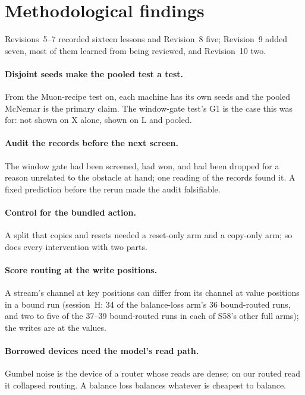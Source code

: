 \documentclass[11pt]{article}
\begin{document}
\section{Methodological findings}
\label{sec:method}

Revisions~5--7 recorded sixteen lessons and Revision~8 five; Revision~9 added seven, most of them learned from being reviewed, and Revision~10 two.

\paragraph{Disjoint seeds make the pooled test a test.} From the Muon-recipe test on, each machine has its own seeds and the pooled McNemar is the primary claim. The window-gate test's G1 is the case this was for: not shown on X alone, shown on L and pooled.

\paragraph{Audit the records before the next screen.} The window gate had been screened, had won, and had been dropped for a reason unrelated to the obstacle at hand; one reading of the records found it. A fixed prediction before the rerun made the audit falsifiable.

\paragraph{Control for the bundled action.} A split that copies and resets needed a reset-only arm and a copy-only arm; so does every intervention with two parts.

\paragraph{Score routing at the write positions.} A stream's channel at key positions can differ from its channel at value positions in a bound run (session~H: 34 of the balance-loss arm's 36 bound-routed runs, and two to five of the 37--39 bound-routed runs in each of S58's other full arms); the writes are at the values.

\paragraph{Borrowed devices need the model's read path.} Gumbel noise is the device of a router whose reads are dense; on our routed read it collapsed routing. A balance loss balances whatever is cheapest to balance.
\end{document}
